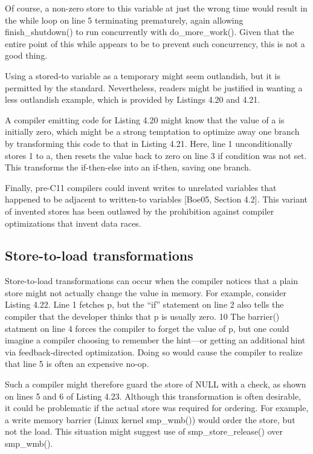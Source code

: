 Of course, a non-zero store to this variable at just the wrong time would
result in the while loop on line 5 terminating prematurely, again allowing
finish\_shutdown() to run concurrently with do\_more\_work(). Given
that the entire point of this while appears to be to prevent such concurrency,
this is not a good thing.

Using a stored-to variable as a temporary might seem outlandish, but
it is permitted by the standard. Nevertheless, readers might be justified
in wanting a less outlandish example, which is provided by Listings 4.20
and 4.21.

A compiler emitting code for Listing 4.20 might know that the value of
a is initially zero, which might be a strong temptation to optimize away
one branch by transforming this code to that in Listing 4.21. Here, line 1
unconditionally stores 1 to a, then resets the value back to zero on line 3
if condition was not set. This transforms the if-then-else into an if-then,
saving one branch.

Finally, pre-C11 compilers could invent writes to unrelated variables
that happened to be adjacent to written-to variables [Boe05, Section 4.2].
This variant of invented stores has been outlawed by the prohibition against
compiler optimizations that invent data races.

\subsection{Store-to-load transformations}

Store-to-load transformations can occur when the compiler notices that
a plain store might not actually change the value in memory. For example,
consider Listing 4.22. Line 1 fetches p, but the “if” statement on line 2
also tells the compiler that the developer thinks that p is usually zero. 10 The
barrier() statment on line 4 forces the compiler to forget the value of
p, but one could imagine a compiler choosing to remember the hint—or
getting an additional hint via feedback-directed optimization. Doing so
would cause the compiler to realize that line 5 is often an expensive no-op.

Such a compiler might therefore guard the store of NULL with a check,
as shown on lines 5 and 6 of Listing 4.23. Although this transformation is
often desirable, it could be problematic if the actual store was required for
ordering. For example, a write memory barrier (Linux kernel smp\_wmb())
would order the store, but not the load. This situation might suggest use of
smp\_store\_release() over smp\_wmb().


